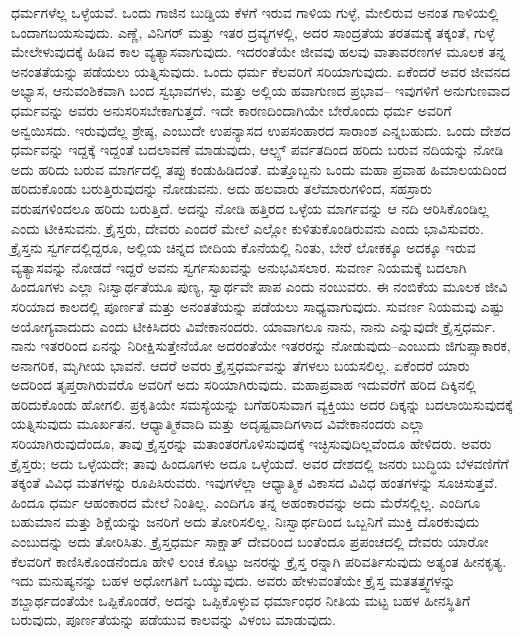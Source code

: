 ಧರ್ಮಗಳೆಲ್ಲ ಒಳ್ಳೆಯವೆ. ಒಂದು ಗಾಜಿನ ಬುಡ್ಡಿಯ ಕೆಳಗೆ ಇರುವ ಗಾಳಿಯ ಗುಳ್ಳೆ, ಮೇಲಿರುವ ಅನಂತ ಗಾಳಿಯಲ್ಲಿ ಒಂದಾಗಬಯಸುವುದು. ಎಣ್ಣೆ, ವಿನಿಗರ್​ ಮತ್ತು ಇತರ ದ್ರವ್ಯಗಳಲ್ಲಿ, ಅದರ ಸಾಂದ್ರತೆಯ ತರತಮಕ್ಕೆ ತಕ್ಕಂತೆ, ಗುಳ್ಳೆ ಮೇಲೇಳುವುದಕ್ಕೆ ಹಿಡಿವ ಕಾಲ ವ್ಯತ್ಯಾಸವಾಗುವುದು. ಇದರಂತೆಯೇ ಜೀವವು ಹಲವು ವಾತಾವರಣಗಳ ಮೂಲಕ ತನ್ನ ಅನಂತತೆಯನ್ನು ಪಡೆಯಲು ಯತ್ನಿಸುವುದು. ಒಂದು ಧರ್ಮ ಕೆಲವರಿಗೆ ಸರಿಯಾಗುವುದು. ಏಕೆಂದರೆ ಅವರ ಜೀವನದ ಅಭ್ಯಾಸ, ಆನುವಂಶಿಕವಾಗಿ ಬಂದ ಸ್ವಭಾವಗಳು, ಮತ್ತು ಅಲ್ಲಿಯ ಹವಾಗುಣದ ಪ್ರಭಾವ– ಇವುಗಳಿಗೆ ಅನುಗುಣವಾದ ಧರ್ಮವನ್ನು ಅವರು ಅನುಸರಿಸಬೇಕಾಗುತ್ತದೆ. ಇದೇ ಕಾರಣದಿಂದಾಗಿಯೇ ಬೇರೊಂದು ಧರ್ಮ ಅವರಿಗೆ ಅನ್ವಯಿಸದು. ಇರುವುದೆಲ್ಲ ಶ್ರೇಷ್ಠ, ಎಂಬುದೇ ಉಪನ್ಯಾಸದ ಉಪಸಂಹಾರದ ಸಾರಾಂಶ ಎನ್ನಬಹುದು. ಒಂದು ದೇಶದ ಧರ್ಮವನ್ನು ಇದ್ದಕ್ಕೆ ಇದ್ದಂತೆ ಬದಲಾವಣೆ ಮಾಡುವುದು, ಆಲ್ಪ್ಸ್ ಪರ್ವತದಿಂದ ಹರಿದು ಬರುವ ನದಿಯನ್ನು ನೋಡಿ ಅದು ಹರಿದು ಬರುವ ಮಾರ್ಗದಲ್ಲಿ ತಪ್ಪು ಕಂಡುಹಿಡಿದಂತೆ. ಮತ್ತೊಬ್ಬನು ಒಂದು ಮಹಾ ಪ್ರವಾಹ ಹಿಮಾಲಯದಿಂದ ಹರಿದುಕೊಂಡು ಬರುತ್ತಿರುವುದನ್ನು ನೋಡುವನು. ಅದು ಹಲವಾರು ತಲೆಮಾರುಗಳಿಂದ, ಸಹಸ್ರಾರು ವರುಷಗಳಿಂದಲೂ ಹರಿದು ಬರುತ್ತಿದೆ. ಅದನ್ನು ನೋಡಿ ಹತ್ತಿರದ ಒಳ್ಳೆಯ ಮಾರ್ಗವನ್ನು ಆ ನದಿ ಆರಿಸಿಕೊಂಡಿಲ್ಲ ಎಂದು ಟೀಕಿಸುವನು. ಕ್ರೈಸ್ತರು, ದೇವರು ಎಂದರೆ ಮೇಲೆ ಎಲ್ಲೋ ಕುಳಿತುಕೊಂಡಿರುವನು ಎಂದು ಭಾವಿಸುವರು. ಕ್ರೈಸ್ತನು ಸ್ವರ್ಗದಲ್ಲಿದ್ದರೂ, ಅಲ್ಲಿಯ ಚಿನ್ನದ ಬೀದಿಯ ಕೊನೆಯಲ್ಲಿ ನಿಂತು, ಬೇರೆ ಲೋಕಕ್ಕೂ ಅದಕ್ಕೂ ಇರುವ ವ್ಯತ್ಯಾಸವನ್ನು ನೋಡದೆ ಇದ್ದರೆ ಅವನು ಸ್ವರ್ಗಸುಖವನ್ನು ಅನುಭವಿಸಲಾರ. ಸುವರ್ಣ ನಿಯಮಕ್ಕೆ ಬದಲಾಗಿ ಹಿಂದೂಗಳು ಎಲ್ಲಾ ನಿಃಸ್ವಾರ್ಥತೆಯೂ ಪುಣ್ಯ, ಸ್ವಾರ್ಥವೇ ಪಾಪ ಎಂದು ನಂಬುವರು. ಈ ನಂಬಿಕೆಯ ಮೂಲಕ ಜೀವಿ ಸರಿಯಾದ ಕಾಲದಲ್ಲಿ ಪೂರ್ಣತೆ ಮತ್ತು ಅನಂತತೆಯನ್ನು ಪಡೆಯಲು ಸಾಧ್ಯವಾಗುವುದು. ಸುವರ್ಣ ನಿಯಮವು ಎಷ್ಟು ಅಯೋಗ್ಯವಾದುದು ಎಂದು ಟೀಕಿಸಿದರು ವಿವೇಕಾನಂದರು. ಯಾವಾಗಲೂ ನಾನು, ನಾನು ಎನ್ನುವುದೇ ಕ್ರೈಸ್ತಧರ್ಮ. ನಾನು ಇತರರಿಂದ ಏನನ್ನು ನಿರೀಕ್ಷಿಸುತ್ತೇನೆಯೋ ಅದರಂತೆಯೇ ಇತರರನ್ನು ನೋಡುವುದು–ಎಂಬುದು ಜಿಗುಪ್ಸಾಕಾರಕ, ಅನಾಗರಿಕ, ಮೃಗೀಯ ಭಾವನೆ. ಆದರೆ ಅವರು ಕ್ರೈಸ್ತಧರ್ಮವನ್ನು ತೆಗಳಲು ಬಯಸಲಿಲ್ಲ. ಏಕೆಂದರೆ ಯಾರು ಅದರಿಂದ ತೃಪ್ತರಾಗಿರುವರೊ ಅವರಿಗೆ ಅದು ಸರಿಯಾಗಿರುವುದು. ಮಹಾಪ್ರವಾಹ ಇದುವರೆಗೆ ಹರಿದ ದಿಕ್ಕಿನಲ್ಲಿ ಹರಿದುಕೊಂಡು ಹೋಗಲಿ. ಪ್ರಕೃತಿಯೇ ಸಮಸ್ಯೆಯನ್ನು ಬಗೆಹರಿಸುವಾಗ ವ್ಯಕ್ತಿಯು ಅದರ ದಿಕ್ಕನ್ನು ಬದಲಾಯಿಸುವುದಕ್ಕೆ ಯತ್ನಿಸುವುದು ಮೂರ್ಖತನ. ಆಧ್ಯಾತ್ಮಿಕವಾದಿ ಮತ್ತು ಅದೃಷ್ಟವಾದಿಗಳಾದ ವಿವೇಕಾನಂದರು ಎಲ್ಲಾ ಸರಿಯಾಗಿರುವುದೆಂದೂ, ತಾವು ಕ್ರೈಸ್ತರನ್ನು ಮತಾಂತರಗೊಳಿಸುವುದಕ್ಕೆ ಇಚ್ಛಿಸುವುದಿಲ್ಲವೆಂದೂ ಹೇಳಿದರು. ಅವರು ಕ್ರೈಸ್ತರು; ಅದು ಒಳ್ಳೆಯದೇ; ತಾವು ಹಿಂದೂಗಳು ಅದೂ ಒಳ್ಳೆಯದೆ. ಅವರ ದೇಶದಲ್ಲಿ ಜನರು ಬುದ್ಧಿಯ ಬೆಳವಣಿಗೆಗೆ ತಕ್ಕಂತೆ ವಿವಿಧ ಮತಗಳನ್ನು ರೂಪಿಸಿರುವರು. ಇವುಗಳೆಲ್ಲಾ ಆಧ್ಯಾತ್ಮಿಕ ವಿಕಾಸದ ವಿವಿಧ ಹಂತಗಳನ್ನು ಸೂಚಿಸುತ್ತವೆ. ಹಿಂದೂ ಧರ್ಮ ಆಹಂಕಾರದ ಮೇಲೆ ನಿಂತಿಲ್ಲ. ಎಂದಿಗೂ ತನ್ನ ಅಹಂಕಾರವನ್ನು ಅದು ಮೆರೆಸಲ್ಲಿಲ್ಲ. ಎಂದಿಗೂ ಬಹುಮಾನ ಮತ್ತು ಶಿಕ್ಷೆಯನ್ನು ಜನರಿಗೆ ಅದು ತೋರಿಸಲಿಲ್ಲ. ನಿಃಸ್ವಾರ್ಥದಿಂದ ಒಬ್ಬನಿಗೆ ಮುಕ್ತಿ ದೊರಕುವುದು ಎಂಬುದನ್ನು ಅದು ತೋರಿಸಿತು. ಕ್ರೈಸ್ತಧರ್ಮ ಸಾಕ್ಷಾತ್​ ದೇವರಿಂದ ಬಂತೆಂದೂ ಪ್ರಪಂಚದಲ್ಲಿ ದೇವರು ಯಾರೋ ಕೆಲವರಿಗೆ ಕಾಣಿಸಿಕೊಂಡನೆಂದೂ ಹೇಳಿ ಲಂಚ ಕೊಟ್ಟು ಜನರನ್ನು ಕ್ರೈಸ್ತ ರನ್ನಾಗಿ ಪರಿವರ್ತಿಸುವುದು ಅತ್ಯಂತ ಹೀನಕೃತ್ಯ. ಇದು ಮನುಷ್ಯನನ್ನು ಬಹಳ ಅಧೋಗತಿಗೆ ಒಯ್ಯುವುದು. ಅವರು ಹೇಳುವಂತೆಯೇ ಕ್ರೈಸ್ತ ಮತತತ್ತ್ವಗಳನ್ನು ಶಬ್ದಾರ್ಥದಂತೆಯೇ ಒಪ್ಪಿಕೊಂಡರೆ, ಅದನ್ನು ಒಪ್ಪಿಕೊಳ್ಳುವ ಧರ್ಮಾಂಧರ ನೀತಿಯ ಮಟ್ಟ ಬಹಳ ಹೀನಸ್ಥಿತಿಗೆ ಬರುವುದು, ಪೂರ್ಣತೆಯನ್ನು ಪಡೆಯುವ ಕಾಲವನ್ನು ವಿಳಂಬ ಮಾಡುವುದು.

